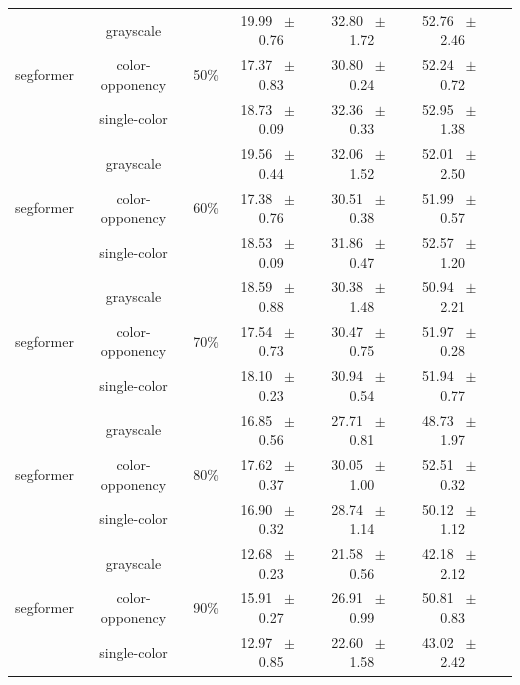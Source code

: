 \begin{table}[h]
\begin{tabular}{@{}lccc ccc@{}}
    \midrule
    \multirow{3}{*}{segformer} & grayscale & \multirow{3}{*}{50\%} & 19.99 ~$\pm$~ 0.76 & 32.80 ~$\pm$~ 1.72 & 52.76 ~$\pm$~ 2.46 \\
    & color-opponency &  & 17.37 ~$\pm$~ 0.83 & 30.80 ~$\pm$~ 0.24 & 52.24 ~$\pm$~ 0.72 \\
    & single-color &  & 18.73 ~$\pm$~ 0.09 & 32.36 ~$\pm$~ 0.33 & 52.95 ~$\pm$~ 1.38 \\
    \midrule
    \multirow{3}{*}{segformer} & grayscale & \multirow{3}{*}{60\%} & 19.56 ~$\pm$~ 0.44 & 32.06 ~$\pm$~ 1.52 & 52.01 ~$\pm$~ 2.50 \\
    & color-opponency &  & 17.38 ~$\pm$~ 0.76 & 30.51 ~$\pm$~ 0.38 & 51.99 ~$\pm$~ 0.57 \\
    & single-color &  & 18.53 ~$\pm$~ 0.09 & 31.86 ~$\pm$~ 0.47 & 52.57 ~$\pm$~ 1.20 \\
    \midrule
    \multirow{3}{*}{segformer} & grayscale & \multirow{3}{*}{70\%} & 18.59 ~$\pm$~ 0.88 & 30.38 ~$\pm$~ 1.48 & 50.94 ~$\pm$~ 2.21 \\
    & color-opponency &  & 17.54 ~$\pm$~ 0.73 & 30.47 ~$\pm$~ 0.75 & 51.97 ~$\pm$~ 0.28 \\
    & single-color &  & 18.10 ~$\pm$~ 0.23 & 30.94 ~$\pm$~ 0.54 & 51.94 ~$\pm$~ 0.77 \\
    \midrule
    \multirow{3}{*}{segformer} & grayscale & \multirow{3}{*}{80\%} & 16.85 ~$\pm$~ 0.56 & 27.71 ~$\pm$~ 0.81 & 48.73 ~$\pm$~ 1.97 \\
    & color-opponency &  & 17.62 ~$\pm$~ 0.37 & 30.05 ~$\pm$~ 1.00 & 52.51 ~$\pm$~ 0.32 \\
    & single-color &  & 16.90 ~$\pm$~ 0.32 & 28.74 ~$\pm$~ 1.14 & 50.12 ~$\pm$~ 1.12 \\
    \midrule
    \multirow{3}{*}{segformer} & grayscale & \multirow{3}{*}{90\%} & 12.68 ~$\pm$~ 0.23 & 21.58 ~$\pm$~ 0.56 & 42.18 ~$\pm$~ 2.12 \\
    & color-opponency &  & 15.91 ~$\pm$~ 0.27 & 26.91 ~$\pm$~ 0.99 & 50.81 ~$\pm$~ 0.83 \\
    & single-color &  & 12.97 ~$\pm$~ 0.85 & 22.60 ~$\pm$~ 1.58 & 43.02 ~$\pm$~ 2.42 \\
    \midrule
    \bottomrule
  \end{tabular}
  \label{tab:sparse_results_segformer_dark_zurich}
\end{table}